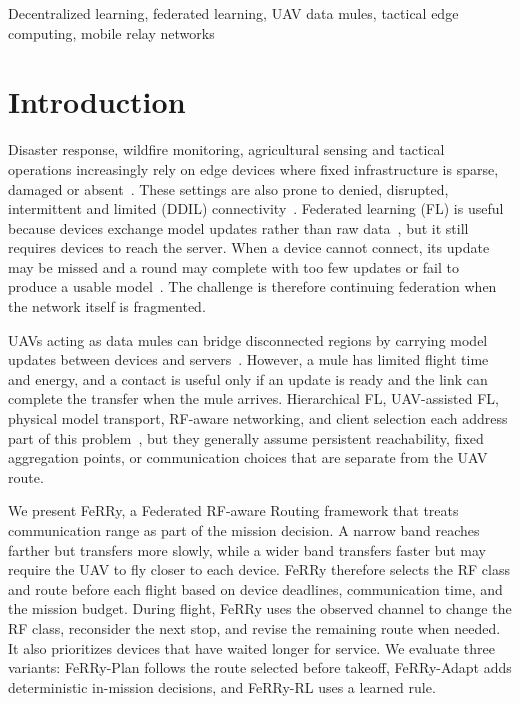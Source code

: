 \documentclass[conference]{IEEEtran}
\newcommand{\sysname}{FeRRy}
\begin{document}
\begin{IEEEkeywords}
Decentralized learning, federated learning, UAV data mules, tactical edge computing, mobile relay networks
\end{IEEEkeywords}

\section{Introduction}
\label{sec:introduction}
Disaster response, wildfire monitoring, agricultural sensing and tactical
operations increasingly rely on edge devices where fixed infrastructure is
sparse, damaged or absent~\cite{zeng2016wireless, song2022comprehensive}.
These settings are also prone to denied, disrupted, intermittent and limited
(DDIL) connectivity~\cite{gupta2015survey}. Federated learning (FL) is useful
because devices exchange model updates rather than raw
data~\cite{mcmahan2017communication, kostage2025hifins}, but it still requires
devices to reach the server. When a device cannot connect, its update may be
missed and a round may complete with too few updates or fail to produce a
usable model~\cite{li2020federated}. The challenge is therefore continuing
federation when the network itself is fragmented.

UAVs acting as data mules can bridge disconnected regions by carrying model
updates between devices and servers~\cite{zhang2025latency, arsalaan2024uavs}.
However, a mule has limited flight time and energy, and a contact is useful only
if an update is ready and the link can complete the transfer when the mule
arrives. Hierarchical FL, UAV-assisted FL, physical model transport, RF-aware
networking, and client selection each address part of this
problem~\cite{liu2020client, lin2023delay, parasnis2023connectivity,
yemini2023robust, mestoukirdi2022uav, bian2025indirect, wang2018deep,
cui2019multi, nishio2019client, lai2021oort}, but they generally assume
persistent reachability, fixed aggregation points, or communication choices
that are separate from the UAV route.

We present \sysname{}, a Federated RF-aware Routing framework that treats
communication range as part of the mission decision. A narrow band reaches
farther but transfers more slowly, while a wider band transfers faster but may
require the UAV to fly closer to each device. \sysname{} therefore selects the
RF class and route before each flight based on device deadlines,
communication time, and the mission budget. During flight, \sysname{} uses the observed channel to change the RF class,
reconsider the next stop, and revise the remaining route when needed. It also
prioritizes devices that have waited longer for service. We evaluate three
variants: \sysname{}-Plan follows the route selected before takeoff,
\sysname{}-Adapt adds deterministic in-mission decisions, and
\sysname{}-RL uses a learned rule.
\end{document}
